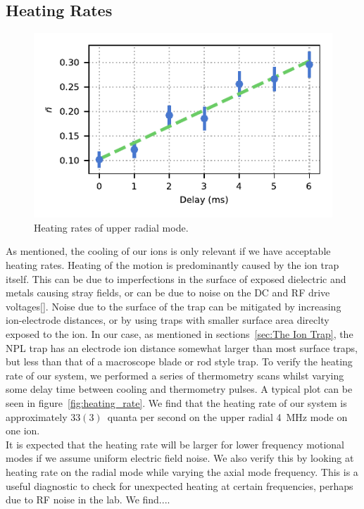 \subsection{Heating Rates}
\label{sec:Heating}

    \begin{figure}
        \begin{center}
        \noindent\includegraphics[width=\linewidth]{
            figures/pdf_figure/heating_rate.pdf
            }
        \end{center}
        \caption{
            Heating rates of upper radial mode.
            }
        \label{fig:heating rates}
    \end{figure}

    As mentioned, the cooling of our ions is only relevant if we have acceptable
    heating rates. Heating of the motion is predominantly caused by the ion trap
    itself. This can be due to imperfections in the surface of exposed
    dielectric and metals causing stray fields, or can be due to noise on the DC
    and RF drive voltages[]. Noise due to the surface of the trap can be
    mitigated by increasing ion-electrode distances, or by using traps with
    smaller surface area direclty exposed to the ion. In our case, as mentioned
    in sections~\ref{sec:The Ion Trap}, the NPL trap has an electrode ion
    distance somewhat larger than most surface traps, but less than that of a
    macroscope blade or rod style trap. To verify the heating rate of our
    system, we performed a series of thermometry scans whilst varying some delay
    time between cooling and thermometry pulses. A typical plot can be seen in
    figure~\ref{fig:heating_rate}. We find that the heating rate of our system
    is approximately $33(3)$~quanta per second on the upper radial 4~MHz mode on
    one ion.\\
    It is expected that the heating rate will be larger for lower frequency
    motional modes if we assume uniform electric field noise. We also verify
    this by looking at heating rate on the radial mode while varying the axial
    mode frequency. This is a useful diagnostic to check for unexpected heating
    at certain frequencies, perhaps due to RF noise in the lab. We find....\\

